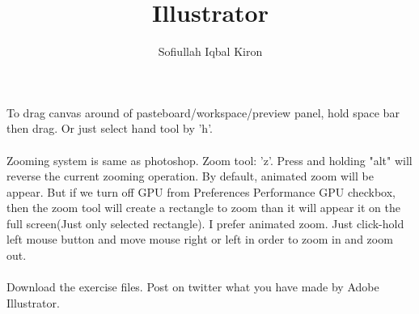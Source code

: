 \documentclass[11 pt]{article}
\title{Illustrator}
\author{Sofiullah Iqbal Kiron}
\begin{document}
\maketitle

\justify
To drag canvas around of pasteboard/workspace/preview panel, hold space bar then drag. Or just select hand tool by 'h'. \\ \\
Zooming system is same as photoshop. Zoom tool: 'z'. Press and holding "alt" will reverse the current zooming operation. By default, animated zoom will be appear. But if we turn off GPU from Preferences Performance GPU checkbox, then the zoom tool will create a rectangle to zoom than it will appear it on the full screen(Just only selected rectangle). I prefer animated zoom. Just click-hold left mouse button and move mouse right or left in order to zoom in and zoom out. \\ \\
Download the exercise files. Post on twitter what you have made by Adobe Illustrator.
\end{document}
